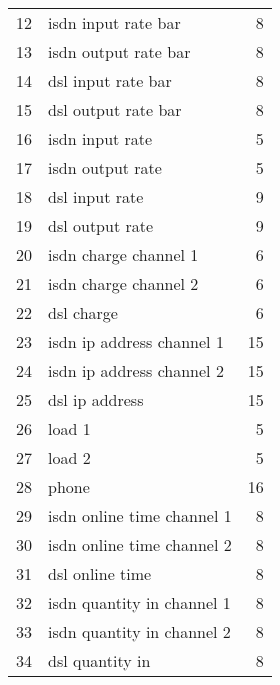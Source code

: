 \begin{description}
\begin{table}[htbp]
\begin{small}
\begin{center}
\begin{tabular}{rlr}
                12 &      isdn input rate bar             &  8 \\
                13 &      isdn output rate bar            &  8 \\
                14 &      dsl input rate bar              &  8 \\
                15 &      dsl output rate bar             &  8 \\

                16 &      isdn input rate                 &  5 \\
                17 &      isdn output rate                &  5 \\
                18 &      dsl input rate                  &  9 \\
                19 &      dsl output rate                 &  9 \\

                20 &      isdn charge channel 1           &  6 \\
                21 &      isdn charge channel 2           &  6 \\
                22 &      dsl charge                      &  6 \\

                23 &      isdn ip address channel 1       & 15 \\
                24 &      isdn ip address channel 2       & 15 \\
                25 &      dsl ip address                  & 15 \\

                26 &      load 1                          &  5 \\
                27 &      load 2                          &  5 \\

                28 &      phone                           & 16 \\

                29 &      isdn online time channel 1      &  8 \\
                30 &      isdn online time channel 2      &  8 \\
                31 &      dsl online time                 &  8 \\

                32 &      isdn quantity in channel 1      &  8 \\
                33 &      isdn quantity in channel 2      &  8 \\
                34 &      dsl quantity in                 &  8 \\


\end{tabular}
\end{center}
\end{small}
\end{table}
\end{description}
